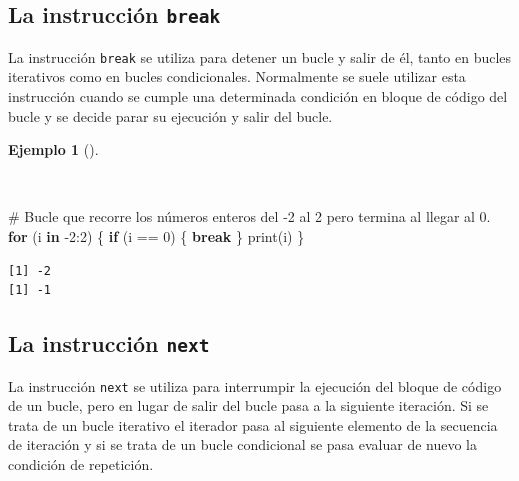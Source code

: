 \documentclass[
  spanish,
  a4paper,
]{scrreport}
\newenvironment{Shaded}{\begin{snugshade}}{\end{snugshade}}
\newcommand{\CommentTok}[1]{\textcolor[rgb]{0.37,0.37,0.37}{#1}}
\newcommand{\ControlFlowTok}[1]{\textcolor[rgb]{0.00,0.23,0.31}{\textbf{#1}}}
\newcommand{\DecValTok}[1]{\textcolor[rgb]{0.68,0.00,0.00}{#1}}
\newcommand{\FunctionTok}[1]{\textcolor[rgb]{0.28,0.35,0.67}{#1}}
\newcommand{\NormalTok}[1]{\textcolor[rgb]{0.00,0.23,0.31}{#1}}
\newcommand{\SpecialCharTok}[1]{\textcolor[rgb]{0.37,0.37,0.37}{#1}}
\theoremstyle{definition}
\theoremstyle{definition}
\newtheorem{example}{Ejemplo}[chapter]
\theoremstyle{remark}
\begin{document}
\subsection{\texorpdfstring{La instrucción
\texttt{break}}{La instrucción break}}\label{la-instrucciuxf3n-break}

La instrucción \texttt{break} se utiliza para detener un bucle y salir
de él, tanto en bucles iterativos como en bucles condicionales.
Normalmente se suele utilizar esta instrucción cuando se cumple una
determinada condición en bloque de código del bucle y se decide parar su
ejecución y salir del bucle.

\begin{example}[]\protect\hypertarget{exm-salida-bucle-break}{}\label{exm-salida-bucle-break}

~

\begin{Shaded}
\begin{Highlighting}[]
\CommentTok{\# Bucle que recorre los números enteros del {-}2 al 2 pero termina al llegar al 0.}
\ControlFlowTok{for}\NormalTok{ (i }\ControlFlowTok{in} \SpecialCharTok{{-}}\DecValTok{2}\SpecialCharTok{:}\DecValTok{2}\NormalTok{) \{}
  \ControlFlowTok{if}\NormalTok{ (i }\SpecialCharTok{==} \DecValTok{0}\NormalTok{) \{}
    \ControlFlowTok{break}
\NormalTok{  \} }
  \FunctionTok{print}\NormalTok{(i)}
\NormalTok{\}}
\end{Highlighting}
\end{Shaded}

\begin{verbatim}
[1] -2
[1] -1
\end{verbatim}

\end{example}

\subsection{\texorpdfstring{La instrucción
\texttt{next}}{La instrucción next}}\label{la-instrucciuxf3n-next}

La instrucción \texttt{next} se utiliza para interrumpir la ejecución
del bloque de código de un bucle, pero en lugar de salir del bucle pasa
a la siguiente iteración. Si se trata de un bucle iterativo el iterador
pasa al siguiente elemento de la secuencia de iteración y si se trata de
un bucle condicional se pasa evaluar de nuevo la condición de
repetición.
\end{document}
